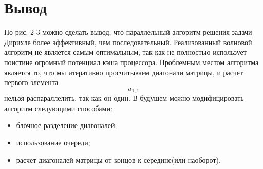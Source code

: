 \documentclass[12pt]{article}
\begin{document}
\newpage
\section{Вывод}
По рис. 2-3 можно сделать вывод, что параллельный алгоритм решения задачи Дирихле более эффективный, чем последовательный. Реализованный волновой алгоритм не является самым оптимальным, так как не полностью использует поистине огромный потенциал кэша процессора. Проблемным местом алгоритма является то, что мы итеративно просчитываем диагонали матрицы, и расчет первого элемента \[u_{1,1}\] нельзя распараллелить, так как он один. В будущем можно модифицировать алгоритм следующими способами: 
	\begin{itemize}
		\item блочное разделение диагоналей;
		\item использование очереди;
		\item расчет диагоналей матрицы от концов к середине(или наоборот).
	\end{itemize}
\end{document}
